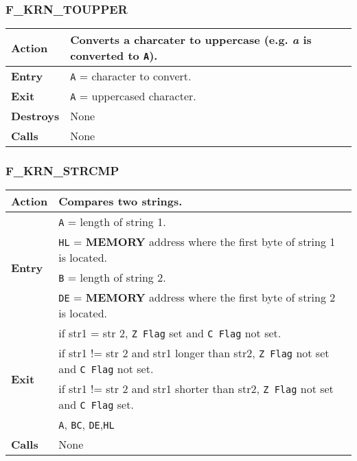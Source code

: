     \subsubsection{F\_KRN\_TOUPPER}
    \label{func:fkrntoupper}
    \begin{tabular}{l p{9cm}}
        \hline\textbf{Action}
        & Converts a charcater to uppercase (e.g. \textit{a} is converted to
        \texttt{A}).\\
        \hline\textbf{Entry} & \texttt{A} = character to convert.\\
        \hline\textbf{Exit} & \texttt{A} = uppercased character.\\
        \hline\textbf{Destroys} & None\\
        \hline\textbf{Calls} & None\\
        \hline
    \end{tabular}

    \subsubsection{F\_KRN\_STRCMP}
    \label{func:fkrnstrcmp}
    \begin{tabular}{l p{9cm}}
        \hline\textbf{Action}
        & Compares two strings.\\
        \hline\multirow[t]{4}{4em}{\textbf{Entry}}
        & \texttt{A} = length of string 1.\\
        & \texttt{HL} = \textbf{MEMORY} address where the first byte of
        string 1 is located.\\
        & \texttt{B} = length of string 2.\\
        & \texttt{DE} = \textbf{MEMORY} address where the first byte of
        string 2 is located.\\
        \hline\multirow[t]{4}{4em}{\textbf{Exit}}
        & if str1 = str 2, \texttt{Z Flag} set and \texttt{C Flag} not set.\\
        & if str1 != str 2 and str1 longer than str2, \texttt{Z Flag} not 
        set and \texttt{C Flag} not set.\\
        & if str1 != str 2 and str1 shorter than str2, \texttt{Z Flag} not 
        set and \texttt{C Flag} set.\\
        \hline\textbf{Destroys} & \texttt{A}, \texttt{BC}, \texttt{DE},\texttt{HL} \\
        \hline\textbf{Calls} & None\\
        \hline
    \end{tabular}

